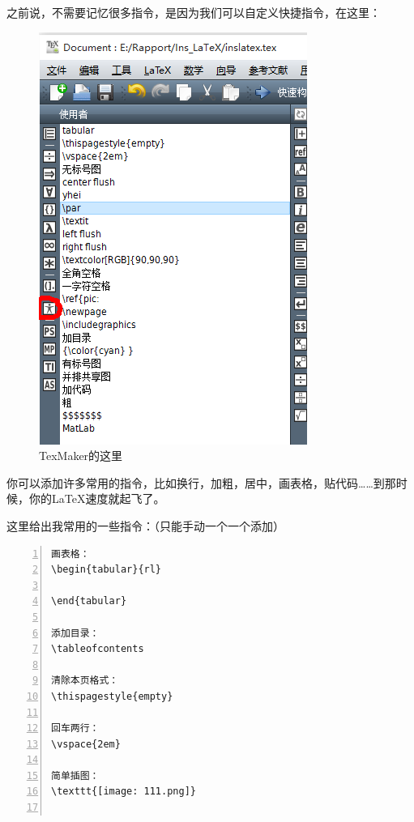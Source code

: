 \documentclass[12pt,a4paper,oneside]{book}
\begin{document}
{\par
之前说，不需要记忆很多指令，是因为我们可以自定义快捷指令，在这里：
\par
\begin{figure}[htp] 
\centering 
\includegraphics[scale=0.85]{Figures/is.png}
\caption{TexMaker的这里}%
\label{pic:is}
\end{figure}
\par
你可以添加许多常用的指令，比如换行，加粗，居中，画表格，贴代码……到那时候，你的LaTeX速度就起飞了。
\par
这里给出我常用的一些指令：（只能手动一个一个添加）
\par
\begin{lstlisting}[language={[ANSI]C}, numbers=left, numberstyle=\tiny, keywordstyle=\color{blue!70},  frame=shadowbox, rulesepcolor=\color{red!20!green!20!blue!20}]
画表格：
\begin{tabular}{rl}

\end{tabular}

添加目录：
\tableofcontents

清除本页格式：
\thispagestyle{empty}

回车两行：
\vspace{2em}

简单插图：
\texttt{[image: 111.png]}


\end{lstlisting}}
\end{document}

